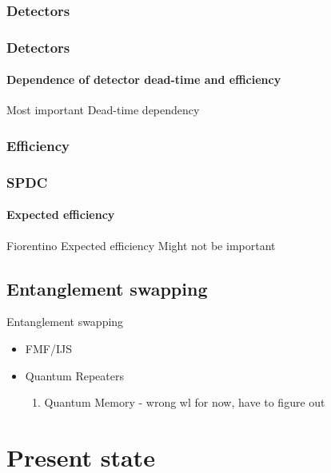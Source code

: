 \documentclass[serif,8pt]{beamer}
\begin{document}
{{\subsubsection{Detectors}
\begin{frame}
	\frametitle{Detectors}
	\framesubtitle{Dependence of detector dead-time and efficiency}
	\Huge Most important
	\large
Dead-time dependency
\end{frame}

\subsubsection{Efficiency}
\begin{frame}
	\frametitle{SPDC}
	\framesubtitle{Expected efficiency}
	Fiorentino Expected efficiency
	Might not be important
\end{frame}

\subsection{Entanglement swapping}
\begin{frame}{Entanglement swapping}
	\begin{itemize}
		\item FMF/IJS
		\item Quantum Repeaters
			\begin{enumerate}
				\item Quantum Memory - wrong wl for now, have to figure out
			\end{enumerate}
	\end{itemize}

\end{frame}

\section{Present state}


}}
\end{document}
